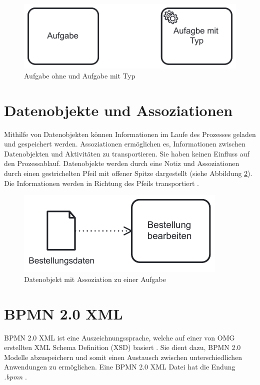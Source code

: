 \begin{figure}[ht]
    \centering
    \includegraphics[width=.5\textwidth]{images/activities}
    \caption{Aufgabe ohne und Aufgabe mit Typ}
    \label{fig:activities}
\end{figure}

\section{Datenobjekte und Assoziationen}

Mithilfe von Datenobjekten können Informationen im Laufe des Prozesses geladen und gespeichert werden. Assoziationen ermöglichen es, Informationen zwischen Datenobjekten und Aktivitäten zu transportieren. Sie haben keinen Einfluss auf den Prozessablauf. Datenobjekte werden durch eine Notiz und Assoziationen durch einen gestrichelten Pfeil mit offener Spitze dargestellt (siehe Abbildung \ref{fig:data_object_association}). Die Informationen werden in Richtung des Pfeils transportiert \cite{omgbpmn}.

\begin{figure}[ht]
    \centering
    \includegraphics[width=.4\textwidth]{images/data_object_association}
    \caption{Datenobjekt mit Assoziation zu einer Aufgabe}
    \label{fig:data_object_association}
\end{figure}

\section{BPMN 2.0 XML}

BPMN 2.0 XML ist eine Auszeichnungssprache, welche auf einer von OMG erstellten XML Schema Definition (XSD) basiert \cite{omgbpmn-xsd}. Sie dient dazu, BPMN 2.0 Modelle abzuspeichern und somit einen Austausch zwischen unterschiedlichen Anwendungen zu ermöglichen. Eine BPMN 2.0 XML Datei hat die Endung \emph{.bpmn} \cite{omgbpmn}.